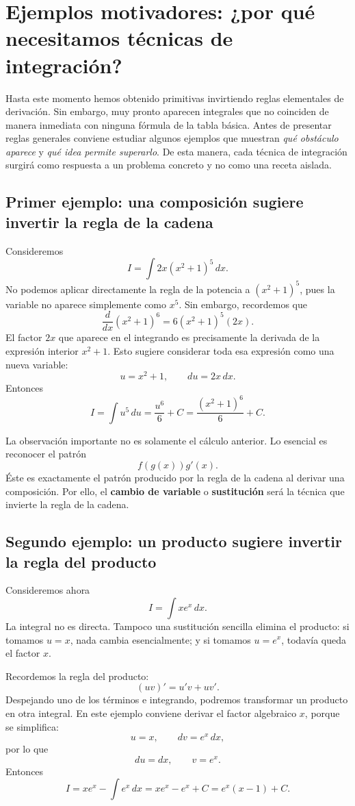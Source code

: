 \documentclass[12pt]{article}
\theoremstyle{definition}\newtheorem{definicion}[teorema]{Definición}\newtheorem{ejemplo}[teorema]{Ejemplo}\newtheorem{ejercicio}[teorema]{Ejercicio}
\theoremstyle{remark}\newtheorem*{observacion}{Observación}\newtheorem*{advertencia}{Advertencia}\newtheorem*{estrategia}{Estrategia}
\begin{document}
\section{Ejemplos motivadores: ¿por qué necesitamos técnicas de integración?}

Hasta este momento hemos obtenido primitivas invirtiendo reglas elementales de derivación. Sin embargo, muy pronto aparecen integrales que no coinciden de manera inmediata con ninguna fórmula de la tabla básica. Antes de presentar reglas generales conviene estudiar algunos ejemplos que muestran \emph{qué obstáculo aparece} y \emph{qué idea permite superarlo}. De esta manera, cada técnica de integración surgirá como respuesta a un problema concreto y no como una receta aislada.

\subsection{Primer ejemplo: una composición sugiere invertir la regla de la cadena}
Consideremos
\[
I=\int 2x(x^2+1)^5\,dx.
\]
No podemos aplicar directamente la regla de la potencia a $(x^2+1)^5$, pues la variable no aparece simplemente como $x^5$. Sin embargo, recordemos que
\[
\frac{d}{dx}(x^2+1)^6=6(x^2+1)^5(2x).
\]
El factor $2x$ que aparece en el integrando es precisamente la derivada de la expresión interior $x^2+1$. Esto sugiere considerar toda esa expresión como una nueva variable:
\[
u=x^2+1,\qquad du=2x\,dx.
\]
Entonces
\[
I=\int u^5\,du=\frac{u^6}{6}+C
=\boxed{\frac{(x^2+1)^6}{6}+C}.
\]

La observación importante no es solamente el cálculo anterior. Lo esencial es reconocer el patrón
\[
\boxed{f(g(x))g'(x)}.
\]
Éste es exactamente el patrón producido por la regla de la cadena al derivar una composición. Por ello, el \textbf{cambio de variable} o \textbf{sustitución} será la técnica que invierte la regla de la cadena.

\subsection{Segundo ejemplo: un producto sugiere invertir la regla del producto}
Consideremos ahora
\[
I=\int xe^x\,dx.
\]
La integral no es directa. Tampoco una sustitución sencilla elimina el producto: si tomamos $u=x$, nada cambia esencialmente; y si tomamos $u=e^x$, todavía queda el factor $x$.

Recordemos la regla del producto:
\[
(uv)'=u'v+uv'.
\]
Despejando uno de los términos e integrando, podremos transformar un producto en otra integral. En este ejemplo conviene derivar el factor algebraico $x$, porque se simplifica:
\[
u=x,\qquad dv=e^x\,dx,
\]
por lo que
\[
du=dx,\qquad v=e^x.
\]
Entonces
\[
I=xe^x-\int e^x\,dx
=xe^x-e^x+C
=\boxed{e^x(x-1)+C}.
\]
\end{document}
